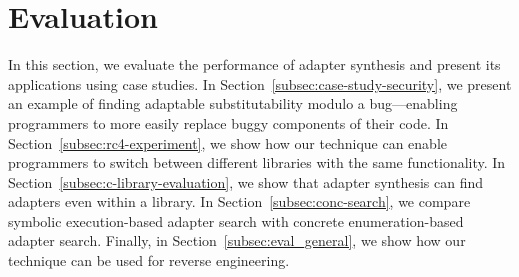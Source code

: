\section{Evaluation}\label{sec:evaluation}
%
In this section, we evaluate the performance of adapter synthesis and
present its applications using case studies.
%
In Section~\ref{subsec:case-study-security}, we present an example of finding
adaptable substitutability modulo a bug---enabling programmers to more easily replace buggy
components of their code.
%
In Section~\ref{subsec:rc4-experiment}, we show how our technique can
enable programmers to switch between different libraries with the same
functionality.
%
In Section~\ref{subsec:c-library-evaluation}, we show that adapter
synthesis can find adapters even within a library.
%
In Section~\ref{subsec:conc-search}, we compare symbolic execution-based adapter search
with concrete enumeration-based adapter search.
%
Finally, in Section~\ref{subsec:eval_general}, we show how our technique can be used for
reverse engineering.
